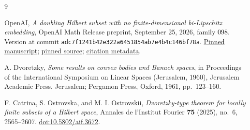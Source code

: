 \documentclass[11pt]{article}
\theoremstyle{remark}
\begin{document}
\begin{thebibliography}{9}
\raggedright
{}
OpenAI, \emph{A doubling Hilbert subset with no finite-dimensional bi-Lipschitz embedding}, OpenAI Math Release preprint, September 25, 2026, family 098. Version at commit \texttt{adc7f1241b42e322a6451854ab7e4b4c146bf78a}.
\href{https://github.com/openai/math/blob/adc7f1241b42e322a6451854ab7e4b4c146bf78a/preprints/A-doubling-Hilbert-subset-with-no-finite-dimensional-bi-Lipschitz-embedding-September-25-2026/main.pdf}{Pinned manuscript};
\href{https://github.com/openai/math/blob/adc7f1241b42e322a6451854ab7e4b4c146bf78a/preprints/A-doubling-Hilbert-subset-with-no-finite-dimensional-bi-Lipschitz-embedding-September-25-2026/build/main.tex}{pinned source};
\href{https://github.com/openai/math/blob/adc7f1241b42e322a6451854ab7e4b4c146bf78a/preprints/A-doubling-Hilbert-subset-with-no-finite-dimensional-bi-Lipschitz-embedding-September-25-2026/README.md}{citation metadata}.

A. Dvoretzky, \emph{Some results on convex bodies and Banach spaces}, in Proceedings of the International Symposium on Linear Spaces (Jerusalem, 1960), Jerusalem Academic Press, Jerusalem; Pergamon Press, Oxford, 1961, pp.~123--160.

F. Catrina, S. Ostrovska, and M. I. Ostrovskii, \emph{Dvoretzky-type theorem for locally finite subsets of a Hilbert space}, Annales de l'Institut Fourier \textbf{75} (2025), no.~6, 2565--2607.
\href{https://doi.org/10.5802/aif.3672}{doi:10.5802/aif.3672}.
\end{thebibliography}
\end{document}
